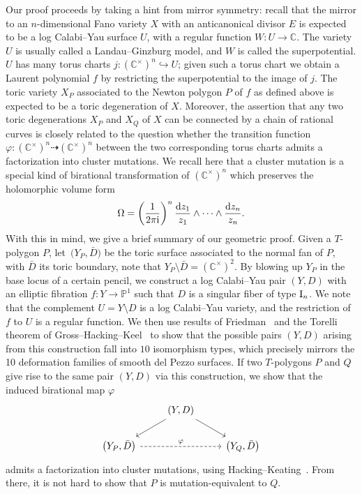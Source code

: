 \documentclass[pdftex]{sigma}
\numberwithin{equation}{section}
\newcommand{\CC}{\mathbb{C}}
\newcommand{\PP}{\mathbb{P}}
\begin{document}
Our proof proceeds by taking a hint from mirror symmetry:
recall that the mirror to an $n$-dimensional Fano variety $X$ with an anticanonical divisor $E$ is expected to be a log Calabi--Yau surface $U$, with a regular function $W \colon U \rightarrow \CC$. The variety $U$ is usually called a Landau--Ginzburg model, and $W$ is called the superpotential. $U$ has many torus charts $j \colon (\CC^\times)^n \hookrightarrow U$; given
such a torus chart we obtain a Laurent polynomial $f$ by restricting the superpotential to the image of $j$. The toric variety $X_P$ associated to the Newton polygon $P$ of $f$ as defined above is expected to be a toric degeneration of $X$.
Moreover, the assertion that any two toric degenerations $X_P$ and $X_Q$ of $X$ can be connected by a chain of rational curves is closely related to the question whether the transition function $\varphi \colon (\CC^\times)^n \dashrightarrow (\CC^\times)^n$ between the two corresponding torus charts admits a factorization into cluster mutations. We recall here that a cluster mutation is a special kind of birational transformation of $(\CC^\times)^n$ which preserves the holomorphic volume form \[
\Omega=\left(\frac{1}{2\pi {\rm i}}\right)^n \frac{{\rm d}z_1}{z_1} \wedge \dots \wedge \frac{{\rm d}z_n}{z_n}.
\]
With this in mind, we give a brief summary of our geometric proof.
Given a $T$-polygon $P$, let~${\bigl(Y_P, \bar{D}\bigr)}$ be the toric surface associated to the normal fan of $P$, with $\bar{D}$ its toric boundary, note that $Y_P \setminus\bar{D}=(\CC^\times)^2$. By blowing up $Y_P$ in the base locus of a certain pencil, we construct a log Calabi--Yau pair $(Y, D)$ with an elliptic fibration $f \colon Y \rightarrow \PP^1$ such that $D$ is a singular fiber of type ${\rm I}_n$. We note that the complement $U=Y \setminus D$ is a log Calabi--Yau variety, and the restriction of $f$ to $U$ is a regular function.
We then use results of Friedman~\cite{Friedman} and the Torelli theorem of Gross--Hacking--Keel~\cite{GrossHackingKeelLooijengapairs} to show that the possible pairs $(Y, D)$ arising from this construction fall into $10$ isomorphism types, which precisely mirrors the 10 deformation families of smooth del Pezzo surfaces.
If two $T$-polygons $P$ and $Q$ give rise to the same pair $(Y, D)$ via this construction, we show that the induced birational map $\varphi$
\[
\begin{tikzcd}
	&(Y, D) \ar[rd] \ar[ld]&\\
	\bigl(Y_P, \bar{D}\bigr) \ar[rr, "\varphi", dashed] &&\bigl(Y_Q, \bar{D}\bigr)
\end{tikzcd}
\]
admits a factorization into cluster mutations, using Hacking--Keating~\cite[Proposition~3.27]{HackingKeating}. From there, it is not hard to show that $P$ is mutation-equivalent to $Q$.
\end{document}
